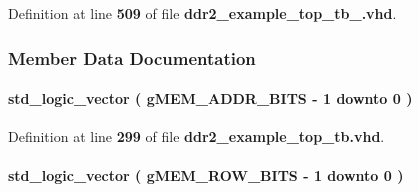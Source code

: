 Definition at line {\bf 509} of file {\bf ddr2\+\_\+example\+\_\+top\+\_\+tb\+\_.\+vhd}.



\subsubsection{Member Data Documentation}
\paragraph[{a}]{ {\bfseries \textcolor{comment}{std\+\_\+logic\+\_\+vector}\textcolor{vhdlchar}{ }\textcolor{vhdlchar}{(}\textcolor{vhdlchar}{ }\textcolor{vhdlchar}{ }\textcolor{vhdlchar}{ }\textcolor{vhdlchar}{ }{\bfseries {\bf g\+M\+E\+M\+\_\+\+A\+D\+D\+R\+\_\+\+B\+I\+TS}} \textcolor{vhdlchar}{-\/}\textcolor{vhdlchar}{ } \textcolor{vhdldigit}{1} \textcolor{vhdlchar}{ }\textcolor{keywordflow}{downto}\textcolor{vhdlchar}{ }\textcolor{vhdlchar}{ } \textcolor{vhdldigit}{0} \textcolor{vhdlchar}{ }\textcolor{vhdlchar}{)}\textcolor{vhdlchar}{ }} \hspace{0.3cm}{\ttfamily [Signal]}}\label{classddr2__example__top__tb_1_1rtl_a7872cdb29f68330cdea0036a4f427f90}


Definition at line {\bf 299} of file {\bf ddr2\+\_\+example\+\_\+top\+\_\+tb.\+vhd}.

\paragraph[{a\+\_\+delayed}]{ {\bfseries \textcolor{comment}{std\+\_\+logic\+\_\+vector}\textcolor{vhdlchar}{ }\textcolor{vhdlchar}{(}\textcolor{vhdlchar}{ }\textcolor{vhdlchar}{ }\textcolor{vhdlchar}{ }\textcolor{vhdlchar}{ }{\bfseries {\bf g\+M\+E\+M\+\_\+\+R\+O\+W\+\_\+\+B\+I\+TS}} \textcolor{vhdlchar}{-\/}\textcolor{vhdlchar}{ } \textcolor{vhdldigit}{1} \textcolor{vhdlchar}{ }\textcolor{keywordflow}{downto}\textcolor{vhdlchar}{ }\textcolor{vhdlchar}{ } \textcolor{vhdldigit}{0} \textcolor{vhdlchar}{ }\textcolor{vhdlchar}{)}\textcolor{vhdlchar}{ }} \hspace{0.3cm}{\ttfamily [Signal]}}\label{classddr2__example__top__tb_1_1rtl_a3d1ec93a6d16e925269662a9b14f8a0d}


